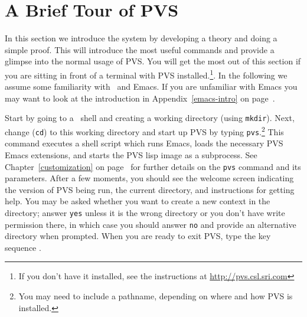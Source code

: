 \chapter{A Brief Tour of PVS}
\label{system-tutorial}

In this section we introduce the system by developing a theory and doing a
simple proof.  This will introduce the most useful commands and provide a
glimpse into the normal usage of PVS.  You will get the most out of this
section if you are sitting in front of a terminal with PVS
installed.\footnote{If you don't have it installed, see the instructions
at \url{http://pvs.csl.sri.com}}.  In the following we assume some
familiarity with \unix\ and Emacs.  If you are unfamiliar with Emacs
you may want to look at the introduction in Appendix~\ref{emacs-intro} on
page~\pageref{emacs-intro}.

Start by going to a \unix\ shell and creating a working directory (using
\texttt{mkdir}). Next, change (\texttt{cd}) to this working directory and
start up PVS by typing \texttt{pvs}.\footnote{You
may need to include a pathname, depending on where and how PVS is
installed.} This command executes a shell script which runs Emacs, loads
the necessary PVS Emacs extensions, and starts the PVS lisp image as a
subprocess.  See Chapter~\ref{customization} on
page~\pageref{customization} for further details on the \texttt{pvs}
command and its parameters.  After a few moments, you should see the
welcome screen indicating the version of PVS being
run, the current directory, and instructions for getting help.  You may be
asked whether you want to create a new context in the directory; answer
\texttt{yes} unless it is the wrong directory or you don't have write
permission there, in which case you should answer \texttt{no} and provide
an alternative directory when prompted.  When you are ready to exit PVS,
type the key sequence .

